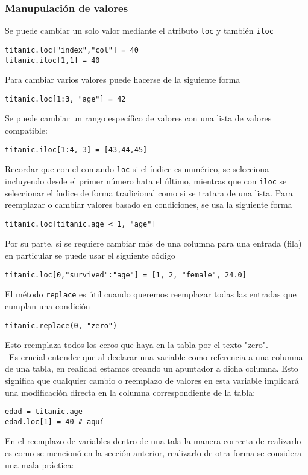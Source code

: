 \subsubsection{Manupulación de valores}
Se puede cambiar un solo valor mediante el atributo \texttt{loc} y también \texttt{iloc}
\begin{verbatim}
titanic.loc["index","col"] = 40
titanic.iloc[1,1] = 40
\end{verbatim}
\noindent Para cambiar varios valores puede hacerse de la siguiente forma
\begin{verbatim}
titanic.loc[1:3, "age"] = 42
\end{verbatim}
\noindent Se puede cambiar un rango específico de valores con una lista de valores compatible:
\begin{verbatim}
titanic.iloc[1:4, 3] = [43,44,45]
\end{verbatim}
\noindent Recordar que con el comando \texttt{loc} si el índice es numérico, se selecciona incluyendo desde el primer número hata el último, mientras que con \texttt{iloc} se seleccionar el índice de forma tradicional como si se tratara de una lista.
\noindent Para reemplazar o cambiar valores basado en condiciones, se usa la siguiente forma
\begin{verbatim}
titanic.loc[titanic.age < 1, "age"]
\end{verbatim}
\noindent Por su parte, si se requiere cambiar más de una columna para una entrada (fila) en particular se puede usar el siguiente código
\begin{verbatim}
titanic.loc[0,"survived":"age"] = [1, 2, "female", 24.0]
\end{verbatim}
\noindent El método \texttt{replace} es útil cuando queremos reemplazar todas las entradas que cumplan una condición
\begin{verbatim}
titanic.replace(0, "zero")
\end{verbatim}
\noindent Esto reemplaza todos los ceros que haya en la tabla por el texto "zero". \\\ 
\noindent Es crucial entender que al declarar una variable como referencia a una columna de una tabla, en realidad estamos creando un apuntador a dicha columna. Esto significa que cualquier cambio o reemplazo de valores en esta variable implicará una modificación directa en la columna correspondiente de la tabla:
\begin{verbatim}
edad = titanic.age
edad.loc[1] = 40 # aquí
\end{verbatim}
\noindent En el reemplazo de variables dentro de una tala la manera correcta de realizarlo es como se mencionó en la sección anterior, realizarlo de otra forma se considera una mala práctica:
